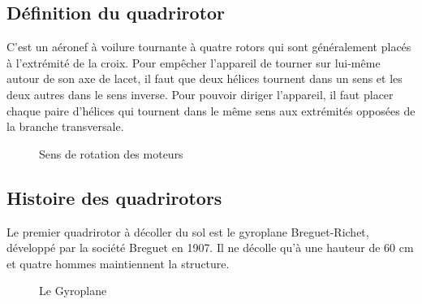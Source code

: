 \subsection{Définition du quadrirotor}
C'est un aéronef à voilure tournante à quatre rotors qui sont généralement placés à l'extrémité de la croix. Pour empêcher l'appareil de tourner sur lui-même autour de son axe de lacet, il faut que deux hélices tournent dans un sens et les deux autres dans le sens inverse\cite{Wikipidea}. Pour pouvoir diriger l'appareil, il faut placer chaque paire d'hélices qui tournent dans le même sens aux extrémités opposées de la branche transversale.
	\begin{figure}[H] 
	\begin{center} 
		\centering
{}	
	\end{center}
	\caption{Sens de rotation des moteurs }
	\end{figure}
	\subsection{Histoire des quadrirotors}
	Le premier quadrirotor à décoller du sol est le gyroplane Breguet-Richet, développé par la société Breguet en 1907. Il ne décolle qu'à une hauteur de 60 cm et quatre hommes maintiennent la structure\cite{Wikipidea}. 
	\begin{figure}[H] 
	\begin{center} 
		\centering
		
	\end{center}
	\caption{Le Gyroplane }
	\end{figure}

